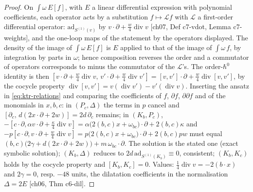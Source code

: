 \begin{proof}
On $\int\omega\,E[f]$, with $E$ a linear differential expression with polynomial coefficients, each operator acts by a substitution $f\mapsto\mathcal Lf$ with $\mathcal L$ a first-order differential operator: $\mathrm{ad}_{S^{(1)}(v)}$ by $v\cdot\partial+\tfrac w4\operatorname{div}v$ [ch07, Def c7-vdot, Lemma c7-weights], and the one-loop maps of the statement by the operators displayed. The density of the image of $\int\omega\,E[f]$ is $E$ applied to that of the image of $\int\omega\,f$, by integration by parts in $\omega$; hence composition reverses the order and a commutator of operators corresponds to minus the commutator of the $\mathcal L$'s. The order-$\hbar^0$ identity is then $[v\cdot\partial+\tfrac w4\operatorname{div}v,\,v'\cdot\partial+\tfrac w4\operatorname{div}v']=[v,v']\cdot\partial+\tfrac w4\operatorname{div}[v,v']$, by the cocycle property $\operatorname{div}[v,v']=v(\operatorname{div}v')-v'(\operatorname{div}v)$. Inserting the ansatz in \eqref{eq:ktr-relations} and comparing the coefficients of $f$, $\partial f$, $\partial\partial f$ and of the monomials in $x,b,c$: in $(P_c,\Delta)$ the terms in $p$ cancel and $[\partial_c,\,d(2x\cdot\partial+2w)]=2d\,\partial_c$ remains; in $(K_b,P_c)$, $-[c\cdot\partial,\alpha v\cdot\partial+\tfrac\kappa4\operatorname{div}v]=\alpha\big(2(b,c)x+\omega_{bc}\big)\cdot\partial+2(b,c)\kappa$ and $-p[c\cdot\partial,v\cdot\partial+\tfrac w4\operatorname{div}v]=p\big(2(b,c)x+\omega_{bc}\big)\cdot\partial+2(b,c)pw$ must equal $(b,c)\big(2\gamma+d(2x\cdot\partial+2w)\big)+m\,\omega_{bc}\cdot\partial$. The solution is the stated one (exact symbolic solution); $(K_b,\Delta)$ reduces to $2d\,\mathrm{ad}_{S^{(1)}(K_b)}\equiv0$, consistent; $(K_b,K_c)$ holds by the cocycle property and $[K_b,K_c]=0$. Values: $\tfrac14\operatorname{div}v=-2(b\cdot x)$ and $2\gamma=0$, resp. $-48$ units, the dilatation coefficients in the normalisation $\Delta=2E$ [ch06, Thm c6-dil].
\end{proof}

